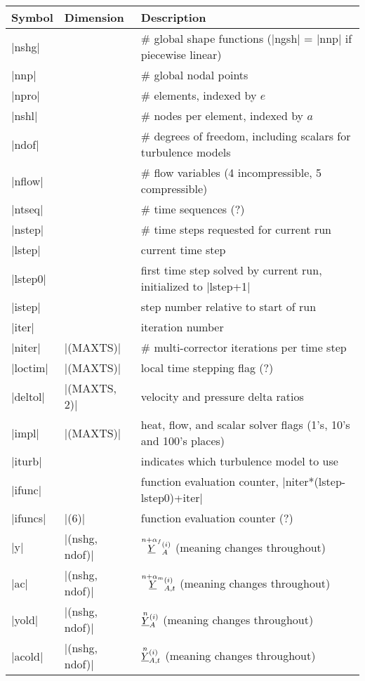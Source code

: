\documentclass[11pt]{article}
\begin{document}
\begin{center}
\begin{tabular}{@{}lll@{}}
\toprule
Symbol & Dimension & Description \\
\midrule
|nshg|   &  & \# global shape functions (|ngsh| = |nnp| if piecewise linear) \\
|nnp|    &  & \# global nodal points \\
|npro|   &  & \# elements, indexed by $e$ \\
|nshl|   &  & \# nodes per element, indexed by $a$ \\
|ndof|   &  & \# degrees of freedom, including scalars for turbulence models \\
|nflow|  &  & \# flow variables (4 incompressible, 5 compressible) \\
|ntseq|  &  & \# time sequences (?) \\
|nstep|  &  & \# time steps requested for current run \\
|lstep|  &  & current time step \\
|lstep0| &  & first time step solved by current run, initialized to |lstep+1| \\
|istep|  &  & step number relative to start of run \\
|iter|   &  & iteration number \\
|niter|  & |(MAXTS)|    & \# multi-corrector iterations per time step \\
|loctim| & |(MAXTS)|    & local time stepping flag (?) \\
|deltol| & |(MAXTS, 2)| & velocity and pressure delta ratios \\
|impl|   & |(MAXTS)|    & heat, flow, and scalar solver flags (1's, 10's and 100's places) \\
|iturb|  &  & indicates which turbulence model to use \\
|ifunc|  &  & function evaluation counter, |niter*(lstep-lstep0)+iter| \\
|ifuncs| & |(6)|						& function evaluation counter (?) \\
|y|      & |(nshg, ndof)|            & $\oset{n+\alpha_f}{\ul{Y}}_{A}^{(i)}$ (meaning changes throughout) \\
|ac|     & |(nshg, ndof)|            & $\oset{n+\alpha_m}{\ul{Y}}_{A,t}^{(i)}$ (meaning changes throughout) \\
|yold|   & |(nshg, ndof)|            & $\oset{n}{\ul{Y}}_{A}^{(i)}$ (meaning changes throughout) \\
|acold|  & |(nshg, ndof)|            & $\oset{n}{\ul{Y}}_{A,t}^{(i)}$ (meaning changes throughout) \\

\end{tabular}
\end{center}
\end{document}
